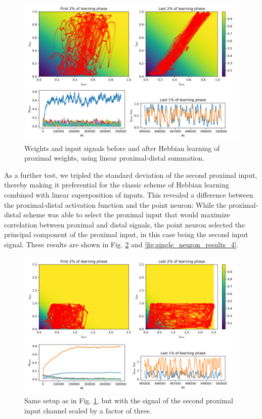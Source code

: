 \documentclass[10pt,a4paper]{article}
\begin{document}
\begin{figure}
\centering
\includegraphics[width=\textwidth]{./figures/single_neuron_results_2.png}
\caption{Weights and input signals before and after Hebbian learning of proximal weights, using linear proximal-distal summation.}
\label{fig:single_neuron_results_2}
\end{figure}

As a further test, we tripled the standard deviation of the second proximal input, thereby making it preferential for the classic scheme of Hebbian learning combined with linear superposition of inputs. This revealed a difference between the proximal-distal activation function and the point neuron: While the proximal-distal scheme was able to select the proximal input that would maximize correlation between proximal and distal signals, the point neuron selected the principal component of the proximal input, in this case being the second input signal. These results are shown in Fig. \ref{fig:single_neuron_results_3} and \ref{fig:single_neuron_results_4}.

\begin{figure}
\centering
\includegraphics[width=\textwidth]{./figures/single_neuron_results_3.png}
\caption{Same setup as in Fig. \ref{fig:single_neuron_results_2}, but with the signal of the second proximal input channel scaled by a factor of three.}
\label{fig:single_neuron_results_3}
\end{figure}
\end{document}
